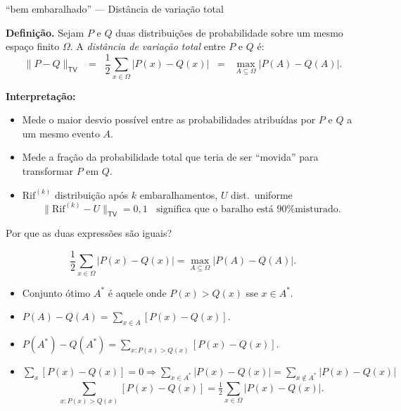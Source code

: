 \documentclass{beamer}
\begin{document}
\begin{frame}{``bem embaralhado'' --- Distância de variação total}
  
  \textbf{Definição.}  Sejam $P$ e $Q$ duas distribuições de
  probabilidade sobre um mesmo espaço finito $\Omega$.  A
  \emph{distância de variação total} entre $P$ e $Q$ é:
  \[
    \|P - Q\|_{{\textsf{TV}}}
    \;\; = \;\;  \frac{1}{2} \sum_{x \in \Omega} |P(x) - Q(x)|
    \;\;  = \;\;  \max_{A \subseteq \Omega} |P(A) - Q(A)|.
  \]
  
  \textbf{Interpretação:}
  \begin{itemize}
  \item Mede o maior desvio possível entre as probabilidades atribuídas
    por $P$ e $Q$ a um mesmo evento $A$.
  \item Mede a fração da
    probabilidade total que teria de ser ``movida'' para transformar
    $P$ em $Q$.
    
    
  \item $\mathrm{Rif}^{(k)}$ distribuição após $k$ embaralhamentos, $U$
    dist.~uniforme
    \[
      \| \mathrm{Rif}^{(k)} - U\|_{{\textsf{TV}}}
      = 0{,}1
      \;\;\text{ significa que o baralho está 90\% misturado.}
    \]  
  \end{itemize}
\end{frame}
\begin{frame}{Por que as duas expressões são iguais?}
 
  \[
     \frac{1}{2} \sum_{x \in \Omega} |P(x) - Q(x)|
    = \max_{A \subseteq \Omega} |P(A) - Q(A)|.
  \]
  
  \begin{itemize}\itemsep=.4cm
    
  \item Conjunto ótimo $A^\ast$ é aquele onde $P(x) > Q(x)$ sse 
    $x\in A^\ast$.
  
  \item \( P(A) - Q(A) = \sum_{x \in A} [P(x) - Q(x)].  \)
    
  \item
    \( P(A^\ast) - Q(A^\ast) = \sum_{x : P(x) > Q(x)} [P(x) - Q(x)].
    \)
      
  \item
    $\displaystyle\sum_x [P(x) - Q(x)] = 0 \Rightarrow \sum_{x \in
      A^\ast} |P(x) - Q(x)| = \sum_{x \notin A^\ast} |P(x) - Q(x)| $
    \[
      \sum_{x : P(x) > Q(x)} [P(x) - Q(x)]
      = \tfrac{1}{2} \sum_{x \in \Omega} |P(x) - Q(x)|.
    \]
  \end{itemize}
  
  
\end{frame}
\end{document}
